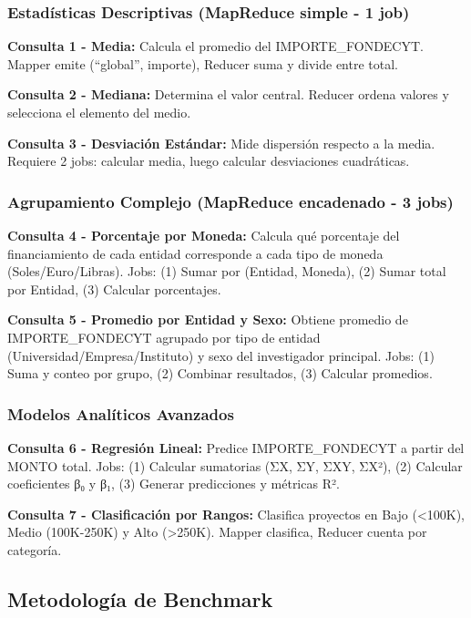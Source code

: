 \documentclass[12pt,a4paper]{article}
\begin{document}
\subsubsection{Estadísticas Descriptivas (MapReduce simple - 1 job)}

\textbf{Consulta 1 - Media:} Calcula el promedio del IMPORTE\_FONDECYT. Mapper emite (``global'', importe), Reducer suma y divide entre total.

\textbf{Consulta 2 - Mediana:} Determina el valor central. Reducer ordena valores y selecciona el elemento del medio.

\textbf{Consulta 3 - Desviación Estándar:} Mide dispersión respecto a la media. Requiere 2 jobs: calcular media, luego calcular desviaciones cuadráticas.

\subsubsection{Agrupamiento Complejo (MapReduce encadenado - 3 jobs)}

\textbf{Consulta 4 - Porcentaje por Moneda:} Calcula qué porcentaje del financiamiento de cada entidad corresponde a cada tipo de moneda (Soles/Euro/Libras). Jobs: (1) Sumar por (Entidad, Moneda), (2) Sumar total por Entidad, (3) Calcular porcentajes.

\textbf{Consulta 5 - Promedio por Entidad y Sexo:} Obtiene promedio de IMPORTE\_FONDECYT agrupado por tipo de entidad (Universidad/Empresa/Instituto) y sexo del investigador principal. Jobs: (1) Suma y conteo por grupo, (2) Combinar resultados, (3) Calcular promedios.

\subsubsection{Modelos Analíticos Avanzados}

\textbf{Consulta 6 - Regresión Lineal:} Predice IMPORTE\_FONDECYT a partir del MONTO total. Jobs: (1) Calcular sumatorias (ΣX, ΣY, ΣXY, ΣX²), (2) Calcular coeficientes β₀ y β₁, (3) Generar predicciones y métricas R².

\textbf{Consulta 7 - Clasificación por Rangos:} Clasifica proyectos en Bajo (<100K), Medio (100K-250K) y Alto (>250K). Mapper clasifica, Reducer cuenta por categoría.

\subsection{Metodología de Benchmark}
\end{document}

